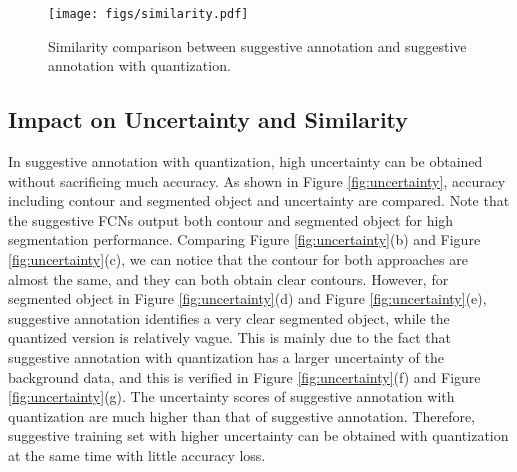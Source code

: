 \documentclass[10pt,twocolumn,letterpaper]{article}
\begin{document}
\begin{figure*}[!htbp]
\begin{center}
\centerline{\texttt{[image: figs/similarity.pdf]}}
\end{center}
\vspace{-20pt}
   \caption{Similarity comparison between suggestive annotation and suggestive annotation with quantization.}
\label{fig:similarity}
\end{figure*}




\subsection{Impact on Uncertainty and Similarity}\label{samples}
In suggestive annotation with quantization, high uncertainty can be obtained without sacrificing much accuracy.
As shown in Figure \ref{fig:uncertainty}, accuracy including contour and segmented object and uncertainty are compared.
Note that the suggestive FCNs output both contour and segmented object for high segmentation performance.
Comparing Figure \ref{fig:uncertainty}(b) and Figure \ref{fig:uncertainty}(c), we can notice that the contour for both approaches are almost the same, and they can both obtain clear contours.
However, for segmented object in Figure \ref{fig:uncertainty}(d) and Figure \ref{fig:uncertainty}(e), suggestive annotation identifies a very clear segmented object, while the quantized version is relatively vague.
This is mainly due to the fact that suggestive annotation with quantization has a larger uncertainty of the background data, and this is verified in Figure \ref{fig:uncertainty}(f) and Figure \ref{fig:uncertainty}(g).
The uncertainty scores of suggestive annotation with quantization are much higher than that of suggestive annotation.
Therefore, suggestive training set with higher uncertainty can be obtained with quantization at the same time with little accuracy loss.
\end{document}
